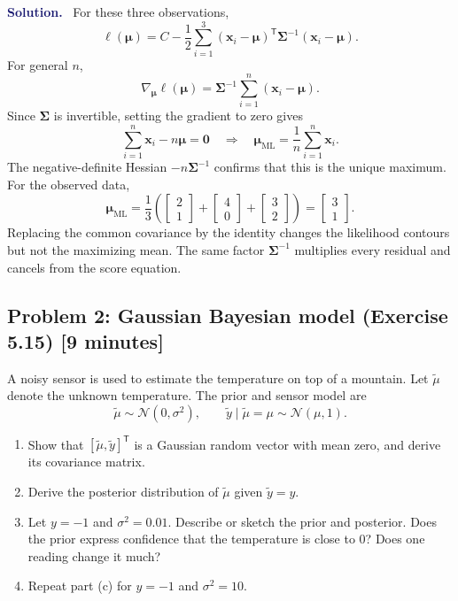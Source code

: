 \documentclass[11pt]{article}
\newcommand{\ML}{\mathrm{ML}}
\newcommand{\rv}[1]{\widetilde{#1}}
\newenvironment{answer}{%
    \par\medskip\noindent\textcolor{MidnightBlue}{\textbf{Solution.}}\ }
    {\par\medskip}
\newcommand{\workingspace}[1]{}
\newcommand{\workingspace}[1]{\vspace{#1}}
\begin{document}
\begin{answer}
For these three observations,
\[
  \ell(\bm{\mu})
  =C-\frac12\sum_{i=1}^3
    (\bm{x}_i-\bm{\mu})^{\mathsf T}\bm{\Sigma}^{-1}
    (\bm{x}_i-\bm{\mu}).
\]
For general $n$,
\[
  \nabla_{\bm{\mu}}\ell(\bm{\mu})
  =\bm{\Sigma}^{-1}\sum_{i=1}^n(\bm{x}_i-\bm{\mu}).
\]
Since $\bm{\Sigma}$ is invertible, setting the gradient to zero gives
\[
  \sum_{i=1}^n\bm{x}_i-n\bm{\mu}=\bm{0}
  \quad\Longrightarrow\quad
  \bm{\mu}_{\ML}=\frac1n\sum_{i=1}^n\bm{x}_i.
\]
The negative-definite Hessian $-n\bm{\Sigma}^{-1}$ confirms that this is the
unique maximum.  For the observed data,
\[
  \bm{\mu}_{\ML}
  =\frac13\left(
    \begin{bmatrix}2\\1\end{bmatrix}
    +\begin{bmatrix}4\\0\end{bmatrix}
    +\begin{bmatrix}3\\2\end{bmatrix}\right)
  =\boxed{\begin{bmatrix}3\\1\end{bmatrix}}.
\]
Replacing the common covariance by the identity changes the likelihood
contours but not the maximizing mean.  The same factor
$\bm{\Sigma}^{-1}$ multiplies every residual and cancels from the score
equation.
\end{answer}

\newpage
\subsection*{Problem 2: Gaussian Bayesian model (Exercise 5.15) \hfill [9 minutes]}
A noisy sensor is used to estimate the temperature on top of a mountain.  Let
$\rv{\mu}$ denote the unknown temperature.  The prior and sensor model are
\[
  \rv{\mu}\sim\mathcal N(0,\sigma^2),
  \qquad
  \rv{y}\mid\rv{\mu}=\mu\sim\mathcal N(\mu,1).
\]
\begin{enumerate}[label=(\alph*),itemsep=0.45em]
  \item Show that $[\rv{\mu},\rv{y}]^{\mathsf T}$ is a Gaussian random vector
        with mean zero, and derive its covariance matrix.
  \item Derive the posterior distribution of $\rv{\mu}$ given $\rv{y}=y$.
  \item Let $y=-1$ and $\sigma^2=0.01$.  Describe or sketch the prior and
        posterior.  Does the prior express confidence that the temperature is
        close to $0$?  Does one reading change it much?
  \item Repeat part (c) for $y=-1$ and $\sigma^2=10$.
\end{enumerate}
\workingspace{6.2cm}
\end{document}
